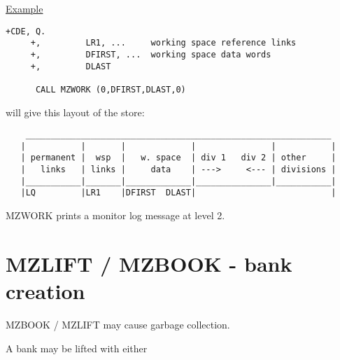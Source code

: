 \ul{Example}
\begin{verbatim}
+CDE, Q.
     +,         LR1, ...     working space reference links
     +,         DFIRST, ...  working space data words
     +,         DLAST

      CALL MZWORK (0,DFIRST,DLAST,0)
\end{verbatim} 
will give this layout of the store:

\begin{verbatim}
    _____________________________________________________________
   |           |       |             |               |           |
   | permanent |  wsp  |   w. space  | div 1   div 2 | other     |
   |   links   | links |     data    | --->     <--- | divisions |
   |___________|_______|_____________|_______________|___________|
   |LQ         |LR1    |DFIRST  DLAST|                           |
\end{verbatim} 

MZWORK prints a monitor log message at level 2.

\section{MZLIFT / MZBOOK - bank creation}

MZBOOK / MZLIFT may cause garbage collection.

A bank may be lifted with either

